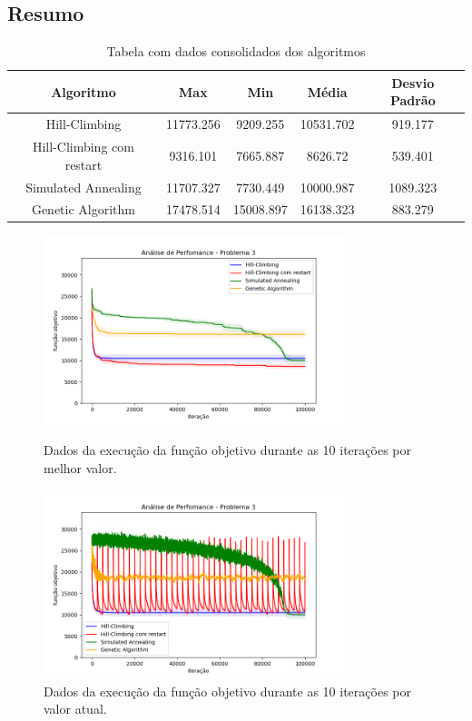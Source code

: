 \subsection{Resumo}

\begin{table}[h!]
\centering
\begin{tabular}{ |c|c|c|c|c|  }
\hline
\rowcolor{lightgray}
Algoritmo & Max & Min & Média & Desvio Padrão \\
\hline
Hill-Climbing & 11773.256 & 9209.255 & 10531.702 & 919.177 \\
\hline
Hill-Climbing com restart & 9316.101 & 7665.887 & 8626.72 & 539.401 \\
\hline
Simulated Annealing & 11707.327 & 7730.449 & 10000.987 & 1089.323 \\
\hline
Genetic Algorithm & 17478.514 & 15008.897 & 16138.323 & 883.279 \\
\hline

\end{tabular}
\caption{Tabela com dados consolidados dos algoritmos}
\end{table}

\begin{figure}[H]
\centering
  \begin{minipage}[b]{0.48\textwidth}
    \includegraphics[width=88mm]{imagens/otima/problema-3-performance-algoritmos-best.png}
    \caption{Dados da execução da função objetivo durante as 10 iterações por melhor valor.
    \label{fig:problema-3-performance-algoritmos-best}}
  \end{minipage}
  \hfill
  \begin{minipage}[b]{0.48\textwidth}
    \includegraphics[width=88mm]{imagens/otima/problema-3-performance-algoritmos-value.png}
    \caption{Dados da execução da função objetivo durante as 10 iterações por valor atual.
    \label{fig:problema-3-performance-algoritmos-value}}
  \end{minipage}
\end{figure}